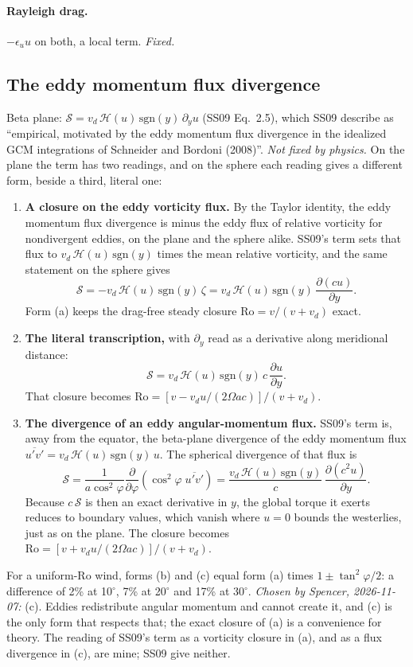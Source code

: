 \documentclass[11pt]{article}
\newcommand{\Ro}{\mathrm{Ro}}
\newcommand{\pd}[2]{\frac{\partial #1}{\partial #2}}
\begin{document}
\paragraph{Rayleigh drag.} $-\epsilon_u u$ on both, a local term. \emph{Fixed.}

\subsection{The eddy momentum flux divergence}
\label{sec:emfd}

Beta plane: $\mathcal{S} = v_d\,\mathcal{H}(u)\,\mathrm{sgn}(y)\,\partial_y u$
(SS09 Eq.~2.5), which SS09 describe as ``empirical, motivated by the eddy
momentum flux divergence in the idealized GCM integrations of Schneider and
Bordoni (2008)''. \emph{Not fixed by physics.} On the plane the term has two
readings, and on the sphere each reading gives a different form, beside a
third, literal one:
\begin{enumerate}[label=(\alph*)]
\item \textbf{A closure on the eddy vorticity flux.} By the Taylor identity, the
  eddy momentum flux divergence is minus the eddy flux of relative vorticity
  for nondivergent eddies, on the plane and the sphere alike. SS09's term sets that flux to
  $v_d\,\mathcal{H}(u)\,\mathrm{sgn}(y)$ times the mean relative vorticity, and
  the same statement on the sphere gives
  \[
    \mathcal{S} = -v_d\,\mathcal{H}(u)\,\mathrm{sgn}(y)\,\zeta
      = v_d\,\mathcal{H}(u)\,\mathrm{sgn}(y)\,\pd{(cu)}{y}.
  \]
  Form (a) keeps the drag-free steady closure $\Ro = v/(v + v_d)$ exact.
\item \textbf{The literal transcription,} with $\partial_y$ read as a derivative
  along meridional distance:
  \[
    \mathcal{S} = v_d\,\mathcal{H}(u)\,\mathrm{sgn}(y)\,c\,\pd{u}{y}.
  \]
  That closure becomes $\Ro = [v - v_d u/(2\Omega a c)]/(v + v_d)$.
\item \textbf{The divergence of an eddy angular-momentum flux.} SS09's term is,
  away from the equator, the beta-plane divergence of the eddy momentum flux
  $\overline{u'v'} = v_d\,\mathcal{H}(u)\,\mathrm{sgn}(y)\,u$. The spherical
  divergence of that flux is
  \[
    \mathcal{S} = \frac{1}{a\cos^2\varphi}\pd{}{\varphi}
      \left(\cos^2\varphi\;\overline{u'v'}\right)
      = \frac{v_d\,\mathcal{H}(u)\,\mathrm{sgn}(y)}{c}\,\pd{(c^2 u)}{y}.
  \]
  Because $c\,\mathcal{S}$ is then an exact derivative in $y$, the global torque
  it exerts reduces to boundary values, which vanish where $u = 0$ bounds the
  westerlies, just as on the plane. The closure becomes
  $\Ro = [v + v_d u/(2\Omega a c)]/(v + v_d)$.
\end{enumerate}
For a uniform-$\Ro$ wind, forms (b) and (c) equal form (a) times
$1 \pm \tan^2\varphi/2$: a difference of 2\% at 10$^\circ$, 7\% at 20$^\circ$
and 17\% at 30$^\circ$. \emph{Chosen by Spencer, 2026-11-07:} (c). Eddies
redistribute angular momentum and cannot create it, and (c) is the only form
that respects that; the exact closure of (a) is a convenience for theory. The
reading of SS09's term
as a vorticity closure in (a), and as a flux divergence in (c), are mine; SS09
give neither.
\end{document}
